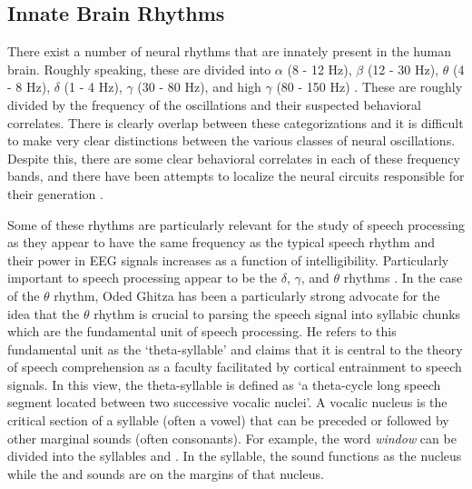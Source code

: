 \documentclass[titlepage]{article}
\begin{document}
  \subsection{Innate Brain Rhythms} \label{innateBrainRhythms}

    There exist a number of neural rhythms that are innately present in the
    human brain. Roughly speaking, these are divided into $\alpha$ (8 - 12 Hz),
    $\beta$ (12 - 30 Hz), $\theta$ (4 - 8 Hz), $\delta$ (1 - 4 Hz), $\gamma$
    (30 - 80 Hz), and high $\gamma$ (80 - 150 Hz)
    \cite{Muresan2008,Rangaswamy2002}. These are roughly divided by the
    frequency of the oscillations and their suspected behavioral correlates.
    There is clearly overlap between these categorizations and it is difficult
    to make very clear distinctions between the various classes of neural
    oscillations. Despite this, there are some clear behavioral correlates in
    each of these frequency bands, and there have been attempts to localize the
    neural circuits responsible for their generation \cite{Michel1992}.

    Some of these rhythms are particularly relevant for the study of speech
    processing as they appear to have the same frequency as the typical speech
    rhythm and their power in EEG signals increases as a function of
    intelligibility. Particularly important to speech processing appear to be
    the $\delta$, $\gamma$, and $\theta$ rhythms \cite{Ghitza2009,Meyer2018}.
    In the case of the $\theta$ rhythm, Oded Ghitza has been a particularly
    strong advocate for the idea that the $\theta$ rhythm is crucial to parsing
    the speech signal into syllabic chunks which are the fundamental unit of
    speech processing. He refers to this fundamental unit as the
    `theta-syllable' \cite{Ghitza2013a} and claims that it is central to the
    theory of speech comprehension as a faculty facilitated by cortical
    entrainment to speech signals. In this view, the theta-syllable is defined
    as `a theta-cycle long speech segment located between two successive vocalic
    nuclei'. A vocalic nucleus is the critical section of a syllable (often a
    vowel) that can be preceded or followed by other marginal sounds (often
    consonants). For example, the word \textit{window} can be divided into the
    syllables  and . In the 
    syllable, the  sound functions as the nucleus while the
     and  sounds are on the margins of that nucleus.
\end{document}
